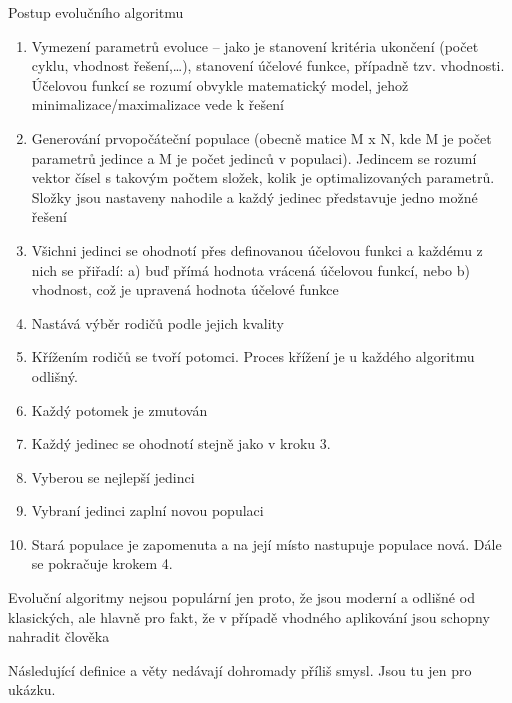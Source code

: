 \documentclass[bc,male,java,dept460]{diploma}		%
\begin{document}
\begin{example}
\label{priklad}
Postup evolučního algoritmu
\begin{enumerate}
\item Vymezení parametrů evoluce – jako je stanovení kritéria ukončení (počet cyklu, vhodnost řešení,…), stanovení účelové funkce, případně tzv. vhodnosti. Účelovou funkcí se rozumí obvykle matematický model, jehož minimalizace/maximalizace vede k řešení
\item Generování prvopočáteční populace (obecně matice M x N, kde M je počet parametrů jedince a M je počet jedinců v populaci). Jedincem se rozumí vektor čísel s takovým počtem složek, kolik je optimalizovaných parametrů. Složky jsou nastaveny nahodile a každý jedinec představuje jedno možné řešení
\item Všichni jedinci se ohodnotí přes definovanou účelovou funkci a každému z nich se přiřadí: a) buď přímá hodnota vrácená účelovou funkcí, nebo b) vhodnost, což je upravená hodnota účelové funkce
\item Nastává výběr rodičů podle jejich kvality
\item Křížením rodičů se tvoří potomci. Proces křížení je u každého algoritmu odlišný.
\item Každý potomek je zmutován
\item Každý jedinec se ohodnotí stejně jako v kroku 3.
\item Vyberou se nejlepší jedinci
\item Vybraní jedinci zaplní novou populaci
\item Stará populace je zapomenuta a na její místo nastupuje populace nová. Dále se pokračuje krokem 4.
\end{enumerate}
Evoluční algoritmy nejsou populární jen proto, že jsou moderní a odlišné od klasických, ale hlavně pro fakt, že v případě vhodného aplikování jsou schopny nahradit člověka
\end{example}

\begin{remark}
Následující definice a věty nedávají dohromady příliš smysl. Jsou tu jen pro ukázku.
\end{remark}
\end{document}
